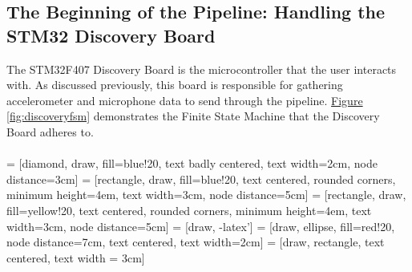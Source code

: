\subsection{The Beginning of the Pipeline: Handling the STM32 Discovery Board}
The STM32F407 Discovery Board is the microcontroller that the user interacts with. As discussed
previously, this board is responsible for gathering accelerometer and microphone data to send
through the pipeline. \hyperref[fig:discoveryfsm]{Figure \ref{fig:discoveryfsm}} demonstrates the
Finite State Machine that the Discovery Board adheres to.\\\\
 = [diamond, draw, fill=blue!20, text badly centered, text width=2cm, node
distance=3cm]
 = [rectangle, draw, fill=blue!20, text centered, rounded corners, minimum
height=4em, text width=3cm, node distance=5cm]
 = [rectangle, draw, fill=yellow!20, text centered, rounded corners, minimum
height=4em, text width=3cm, node distance=5cm]
 = [draw, -latex']
 = [draw, ellipse, fill=red!20, node distance=7cm, text centered, text width=2cm]
 = [draw, rectangle, text centered, text width = 3cm]
